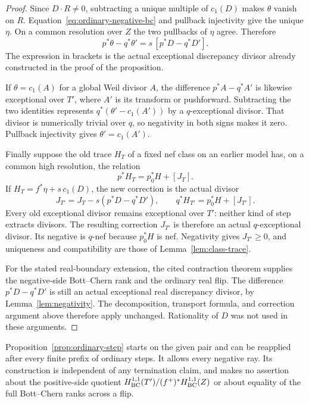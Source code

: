 \begin{proof}
Since $D\cdot R\ne0$, subtracting a unique multiple of $c_1(D)$ makes
$\theta$ vanish on $R$.  Equation~\eqref{eq:ordinary-negative-bc} and
pullback injectivity give the unique $\eta$.  On a common resolution
over $Z$ the two pullbacks of $\eta$ agree.  Therefore
\[
 p^*\theta-q^*\theta'
       =s\,[p^*D-q^*D'].
\]
The expression in brackets is the actual exceptional discrepancy
divisor already constructed in the proof of the proposition.

If $\theta=c_1(A)$ for a global Weil divisor $A$, the difference
$p^*A-q^*A'$ is likewise exceptional over $T'$, where $A'$ is its
transform or pushforward.  Subtracting the two identities represents
$q^*(\theta'-c_1(A'))$ by a $q$-exceptional divisor.  That divisor is
numerically trivial over $q$, so negativity in both signs makes it
zero.  Pullback injectivity gives $\theta'=c_1(A')$.

Finally suppose the old trace $H_T$ of a fixed nef class on an earlier
model has, on a common high resolution, the relation
\[
 p^*H_T=p_0^*H+[J_T].
\]
If $H_T=f^*\eta+s\,c_1(D)$, the new correction is the actual divisor
\[
 J_{T'}=J_T-s(p^*D-q^*D'),\qquad
 q^*H_{T'}=p_0^*H+[J_{T'}].
\]
Every old exceptional divisor remains exceptional
over $T'$: neither kind of step extracts divisors.  The resulting
correction $J_{T'}$ is therefore an actual $q$-exceptional divisor.
Its negative is $q$-nef because $p_0^*H$ is nef.  Negativity gives
$J_{T'}\geq0$, and uniqueness and compatibility are those of
Lemma~\ref{lem:class-trace}.

For the stated real-boundary extension, the cited contraction theorem
supplies the negative-side Bott--Chern rank and the ordinary real flip.
The difference $p^*D-q^*D'$ is still an actual exceptional real
discrepancy divisor, by Lemma~\ref{lem:negativity}.  The decomposition,
transport formula, and correction argument above therefore apply
unchanged.  Rationality of $D$ was not used in these arguments.
\end{proof}

\begin{remark}\label{rem:ordinary-continuation}
Proposition~\ref{prop:ordinary-step} starts on the given pair and can be
reapplied after every finite prefix of ordinary steps.  It allows every
negative ray.  Its construction is independent of any termination
claim, and makes no assertion about the positive-side quotient
$H^{1,1}_{\mathrm{BC}}(T')/(f^+)^*H^{1,1}_{\mathrm{BC}}(Z)$ or about equality of the full Bott--Chern ranks
across a flip.
\end{remark}
